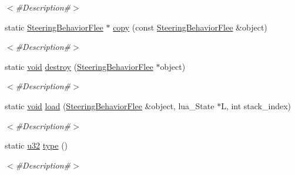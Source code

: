 \begin{DoxyCompactItemize}
\begin{DoxyCompactList}\small\item\em $<$\#\+Description\#$>$ \end{DoxyCompactList}\item 
static \mbox{\hyperlink{classnjli_1_1_steering_behavior_flee}{Steering\+Behavior\+Flee}} $\ast$ \mbox{\hyperlink{classnjli_1_1_steering_behavior_flee_aab44be6e0c476eab26a281c939af37b6}{copy}} (const \mbox{\hyperlink{classnjli_1_1_steering_behavior_flee}{Steering\+Behavior\+Flee}} \&object)
\begin{DoxyCompactList}\small\item\em $<$\#\+Description\#$>$ \end{DoxyCompactList}\item 
static \mbox{\hyperlink{_thread_8h_af1e856da2e658414cb2456cb6f7ebc66}{void}} \mbox{\hyperlink{classnjli_1_1_steering_behavior_flee_a3c9d9cc3934c6c6e12f44298f5189a6f}{destroy}} (\mbox{\hyperlink{classnjli_1_1_steering_behavior_flee}{Steering\+Behavior\+Flee}} $\ast$object)
\begin{DoxyCompactList}\small\item\em $<$\#\+Description\#$>$ \end{DoxyCompactList}\item 
static \mbox{\hyperlink{_thread_8h_af1e856da2e658414cb2456cb6f7ebc66}{void}} \mbox{\hyperlink{classnjli_1_1_steering_behavior_flee_a40035596d46b8133b30866e34a1e0395}{load}} (\mbox{\hyperlink{classnjli_1_1_steering_behavior_flee}{Steering\+Behavior\+Flee}} \&object, lua\+\_\+\+State $\ast$L, int stack\+\_\+index)
\begin{DoxyCompactList}\small\item\em $<$\#\+Description\#$>$ \end{DoxyCompactList}\item 
static \mbox{\hyperlink{_util_8h_a10e94b422ef0c20dcdec20d31a1f5049}{u32}} \mbox{\hyperlink{classnjli_1_1_steering_behavior_flee_a38a803a3d1269dd2c3ae09d1272156c8}{type}} ()
\begin{DoxyCompactList}\small\item\em $<$\#\+Description\#$>$ \end{DoxyCompactList}\end{DoxyCompactItemize}
